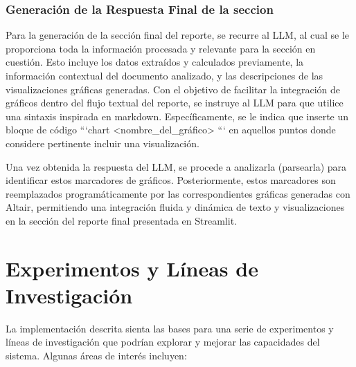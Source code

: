 \subsubsection{Generación de la Respuesta Final de la seccion}

Para la generación de la sección final del reporte, se recurre al LLM, al cual se le proporciona toda la información procesada y relevante para la sección en cuestión. Esto incluye los datos extraídos y calculados previamente, la información contextual del documento analizado, y las descripciones de las visualizaciones gráficas generadas. Con el objetivo de facilitar la integración de gráficos dentro del flujo textual del reporte, se instruye al LLM para que utilice una sintaxis inspirada en markdown. Específicamente, se le indica que inserte un bloque de código ```chart <nombre\_del\_gráfico> ``` en aquellos puntos donde considere pertinente incluir una visualización.

Una vez obtenida la respuesta del LLM, se procede a analizarla (parsearla) para identificar estos marcadores de gráficos. Posteriormente, estos marcadores son reemplazados programáticamente por las correspondientes gráficas generadas con Altair, permitiendo una integración fluida y dinámica de texto y visualizaciones en la sección del reporte final presentada en Streamlit.

\section{Experimentos y Líneas de Investigación}

La implementación descrita sienta las bases para una serie de experimentos y líneas de investigación que podrían explorar y mejorar las capacidades del sistema.  Algunas áreas de interés incluyen:

